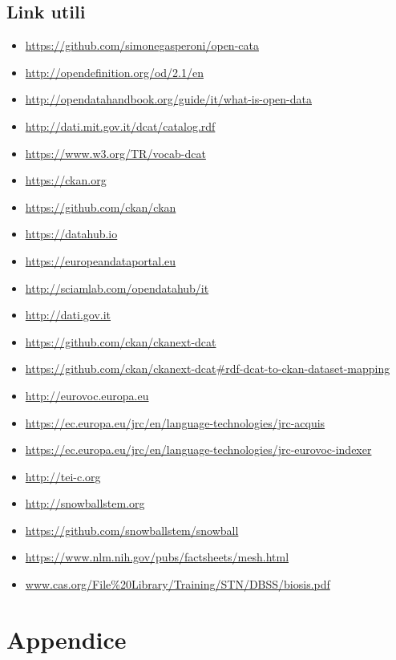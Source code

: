\documentclass{article}
\theoremstyle{plain}
\theoremstyle{definition}
\begin{document}
\subsection{Link utili}
\begin{itemize}
\item \url{https://github.com/simonegasperoni/open-cata}
\item \url{http://opendefinition.org/od/2.1/en}
\item \url{http://opendatahandbook.org/guide/it/what-is-open-data}
\item \url{http://dati.mit.gov.it/dcat/catalog.rdf}
\item \url{https://www.w3.org/TR/vocab-dcat}
\item \url{https://ckan.org}
\item \url{https://github.com/ckan/ckan}
\item \url{https://datahub.io}
\item \url{https://europeandataportal.eu}
\item \url{http://sciamlab.com/opendatahub/it}
\item \url{http://dati.gov.it}
\item \url{https://github.com/ckan/ckanext-dcat}
\item \url{https://github.com/ckan/ckanext-dcat#rdf-dcat-to-ckan-dataset-mapping}
\item \url{http://eurovoc.europa.eu}
\item \url{https://ec.europa.eu/jrc/en/language-technologies/jrc-acquis}
\item \url{https://ec.europa.eu/jrc/en/language-technologies/jrc-eurovoc-indexer}
\item \url{http://tei-c.org}
\item \url{http://snowballstem.org}
\item \url{https://github.com/snowballstem/snowball}
\item \url{https://www.nlm.nih.gov/pubs/factsheets/mesh.html}
\item \url{www.cas.org/File%20Library/Training/STN/DBSS/biosis.pdf}
\end{itemize}

\newpage
\section{Appendice}
\end{document}
